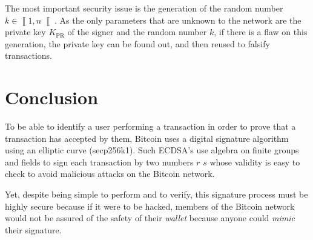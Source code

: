\documentclass{IEEEtran}
\newcommand{\private}[1]{{#1}_{\text{PR}}}
\newcommand{\intint}[2]{\left\llbracket#1, #2\right\llbracket}
\begin{document}
	The most important security issue is the generation of the random number $k \in \intint 1n$.
	As the only parameters that are unknown to the network are the private key $\private K$ of the
	signer and the random number $k$, if there is a flaw on this generation, the private key can be
	found out, and then reused to falsify transactions.~\cite{rfc6979}

\section{Conclusion}
To be able to identify a user performing a transaction in order to prove that a transaction has
accepted by them, Bitcoin uses a digital signature algorithm using an elliptic curve (secp256k1).
Such ECDSA's use algebra on finite groups and fields to sign each transaction by two numbers $r$
$s$ whose validity is easy to check to avoid malicious attacks on the Bitcoin network.

Yet, despite being simple to perform and to verify, this signature process must be highly
secure because if it were to be hacked, members of the Bitcoin network would not be assured of
the safety of their \textit{wallet} because anyone could \textit{mimic} their signature.

{}

\end{document}
